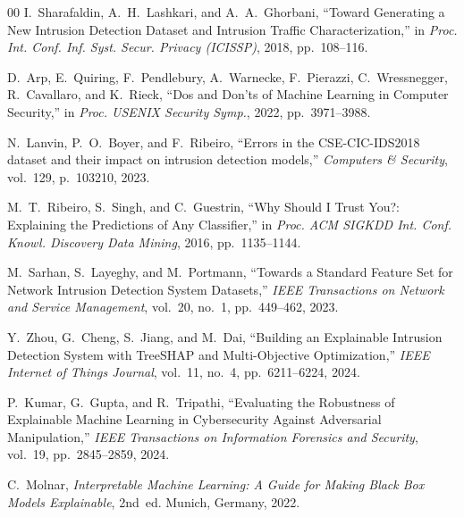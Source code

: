\documentclass[conference]{IEEEtran}
\begin{document}
\begin{thebibliography}{00}
I.~Sharafaldin, A.~H.~Lashkari, and A.~A.~Ghorbani, ``Toward Generating a New Intrusion Detection Dataset and Intrusion Traffic Characterization,'' in \textit{Proc. Int. Conf. Inf. Syst. Secur. Privacy (ICISSP)}, 2018, pp.~108--116.

D.~Arp, E.~Quiring, F.~Pendlebury, A.~Warnecke, F.~Pierazzi, C.~Wressnegger, R.~Cavallaro, and K.~Rieck, ``Dos and Don'ts of Machine Learning in Computer Security,'' in \textit{Proc. USENIX Security Symp.}, 2022, pp.~3971--3988.

N.~Lanvin, P.~O.~Boyer, and F.~Ribeiro, ``Errors in the CSE-CIC-IDS2018 dataset and their impact on intrusion detection models,'' \textit{Computers \& Security}, vol.~129, p.~103210, 2023.

M.~T.~Ribeiro, S.~Singh, and C.~Guestrin, ``Why Should I Trust You?: Explaining the Predictions of Any Classifier,'' in \textit{Proc. ACM SIGKDD Int. Conf. Knowl. Discovery Data Mining}, 2016, pp.~1135--1144.

M.~Sarhan, S.~Layeghy, and M.~Portmann, ``Towards a Standard Feature Set for Network Intrusion Detection System Datasets,'' \textit{IEEE Transactions on Network and Service Management}, vol.~20, no.~1, pp.~449--462, 2023.

Y.~Zhou, G.~Cheng, S.~Jiang, and M.~Dai, ``Building an Explainable Intrusion Detection System with TreeSHAP and Multi-Objective Optimization,'' \textit{IEEE Internet of Things Journal}, vol.~11, no.~4, pp.~6211--6224, 2024.

P.~Kumar, G.~Gupta, and R.~Tripathi, ``Evaluating the Robustness of Explainable Machine Learning in Cybersecurity Against Adversarial Manipulation,'' \textit{IEEE Transactions on Information Forensics and Security}, vol.~19, pp.~2845--2859, 2024.

C.~Molnar, \textit{Interpretable Machine Learning: A Guide for Making Black Box Models Explainable}, 2nd~ed. Munich, Germany, 2022.
\end{thebibliography}
\end{document}
